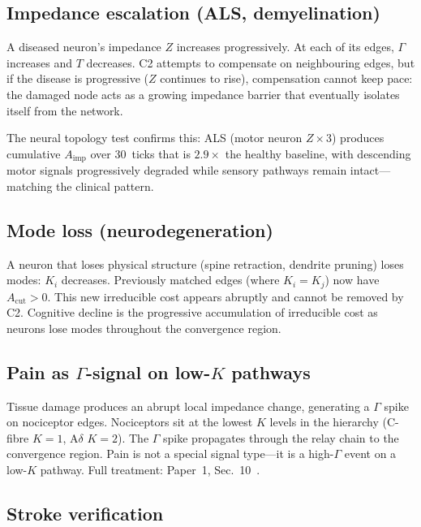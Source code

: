 \documentclass[aps,pre,twocolumn,superscriptaddress,floatfix]{revtex4-2}
\begin{document}
\subsection{Impedance escalation (ALS, demyelination)}
\label{sec:als}

A diseased neuron's impedance $Z$ increases
progressively.
At each of its edges, $\Gamma$ increases and $T$
decreases.
C2 attempts to compensate on neighbouring edges, but if
the disease is progressive ($Z$ continues to rise),
compensation cannot keep pace: the damaged node acts as
a growing impedance barrier that eventually isolates
itself from the network.

The neural topology test confirms this: ALS
(motor neuron $Z \times 3$) produces cumulative
$A_{\text{imp}}$ over 30~ticks that is $2.9\times$
the healthy baseline, with descending motor signals
progressively degraded while sensory pathways remain
intact---matching the clinical pattern.


\subsection{Mode loss (neurodegeneration)}
\label{sec:mode-loss}

A neuron that loses physical structure (spine
retraction, dendrite pruning) loses modes:
$K_i$ decreases.
Previously matched edges (where $K_i = K_j$) now
have $A_{\text{cut}} > 0$.
This new irreducible cost appears abruptly and cannot
be removed by C2.
Cognitive decline is the progressive accumulation of
irreducible cost as neurons lose modes throughout the
convergence region.


\subsection{Pain as $\Gamma$-signal on low-$K$ pathways}
\label{sec:pain-signal}

Tissue damage produces an abrupt local impedance
change, generating a $\Gamma$ spike on nociceptor edges.
Nociceptors sit at the lowest $K$ levels in the
hierarchy (C-fibre $K = 1$, A$\delta$ $K = 2$).
The $\Gamma$ spike propagates through the relay chain
to the convergence region.
Pain is not a special signal type---it is a
high-$\Gamma$ event on a low-$K$ pathway.
Full treatment: Paper~1, Sec.~10~\cite{Paper1}.


\subsection{Stroke verification}
\label{sec:stroke-verify}
\end{document}
